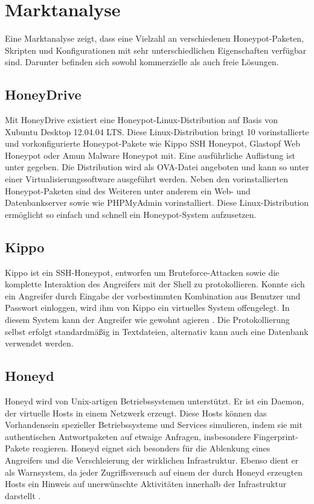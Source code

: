 \chapter{Marktanalyse}
\label{ch:Marktanalyse}

Eine Marktanalyse zeigt, dass eine Vielzahl an verschiedenen Honeypot-Paketen, Skripten und Konfigurationen mit sehr unterschiedlichen Eigenschaften verfügbar sind. Darunter befinden sich sowohl kommerzielle als auch freie Lösungen.

\section{HoneyDrive}
\label{sec:HoneyDrive}
Mit HoneyDrive existiert eine Honeypot-Linux-Distribution auf Basis von Xubuntu Desktop 12.04.04 LTS. Diese Linux-Distribution bringt 10 vorinstallierte und vorkonfigurierte Honeypot-Pakete wie Kippo SSH Honeypot, Glastopf Web Honeypot oder Amun Malware Honeypot mit. Eine ausführliche Auflistung ist unter \cite{honeydrive16} gegeben. Die Distribution wird als OVA-Datei angeboten und kann so unter einer Virtualisierungssoftware ausgeführt werden. Neben den vorinstallierten Honeypot-Paketen sind des Weiteren unter anderem ein Web- und Datenbankserver sowie wie PHPMyAdmin vorinstalliert.
Diese Linux-Distribution ermöglicht so einfach und schnell ein Honeypot-System aufzusetzen.\\


\section{Kippo}
\label{sec:Kippo}
Kippo ist ein SSH-Honeypot, entworfen um Bruteforce-Attacken sowie die komplette Interaktion des Angreifers mit der Shell zu protokollieren. Konnte sich ein Angreifer durch Eingabe der vorbestimmten Kombination aus Benutzer und Passwort einloggen, wird ihm von Kippo ein virtuelles System offengelegt. In diesem System kann der Angreifer wie gewohnt agieren \cite{Kippo16}. Die Protokollierung selbst erfolgt standardmäßig in Textdateien, alternativ kann auch eine Datenbank verwendet werden.\\



\section{Honeyd}
\label{sec:Honeyd}
Honeyd wird von Unix-artigen Betriebssystemen unterstützt. Er ist ein Daemon, der virtuelle Hosts in einem Netzwerk erzeugt. Diese Hosts können das Vorhandensein spezieller Betriebssysteme und Services simulieren, indem sie mit authentischen Antwortpaketen auf etwaige Anfragen, insbesondere Fingerprint-Pakete reagieren. Honeyd eignet sich besonders für die Ablenkung eines Angreifers und die Verschleierung der wirklichen Infrastruktur. Ebenso  dient er als Warnsystem, da jeder Zugriffsversuch auf einem der durch Honeyd erzeugten Hosts ein Hinweis auf unerwünschte Aktivitäten innerhalb der Infrastruktur darstellt \cite{Honeyd16}.\\



